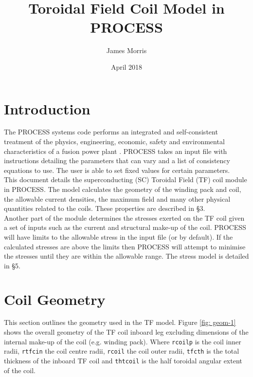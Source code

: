 \documentclass[hidelinks]{article}
\title{Toroidal Field Coil Model in PROCESS}
\author{James Morris}
\date{April 2018}
\numberwithin{equation}{section}
\begin{document}
    
    \maketitle
    
    \tableofcontents
    
    \clearpage
    
    \section{Introduction}
    
    The PROCESS systems code performs an integrated and self-consistent treatment 
    of the physics, engineering, economic, safety and environmental characteristics 
    of a fusion power plant \cite{kovari2014}. PROCESS takes an input file with 
    instructions detailing the parameters that can vary and a list of consistency 
    equations to use. The user is able to set fixed values for certain parameters.\\
    
    \noi This document details the superconducting (SC) Toroidal Field (TF) coil module 
    in PROCESS. The model calculates the geometry of the winding pack and coil, the 
    allowable current densities, the maximum field and many other physical quantities 
    related to the coils. These properties are described in \S 3.\\

    \noi Another part of the module determines the stresses exerted on the TF coil given 
    a set of inputs such as the current and structural make-up of the coil. PROCESS 
    will have limits to the allowable stress in the input file (or by default). If 
    the calculated stresses are above the limits then PROCESS will attempt to minimise 
    the stresses until they are within the allowable range. The stress model is 
    detailed in \S 5.

    \section{Coil Geometry}

    This section outlines the geometry used in the TF model. Figure 
    \ref{fig: geom-1}  shows the overall geometry of the TF coil inboard leg excluding 
    dimensions of the internal make-up of the coil (e.g. winding pack). Where 
    \texttt{rcoilp} is the coil inner radii, \texttt{rtfcin} the coil centre radii, 
    \texttt{rcoil} the coil outer radii, \texttt{tfcth} is the total thickness of 
    the inboard TF coil and \texttt{thtcoil} is the half toroidal angular extent of the coil.
        
\end{document}
